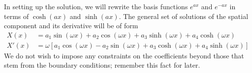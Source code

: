 \documentclass[a4paper]{article}
\begin{document}
In setting up the solution, we will rewrite the basis functions \( e^{ax} \) and \( e^{-ax} \) in terms of \( \cosh\!\left(ax\right) \) and \( \sinh\!\left(ax\right) \). The general set of solutions of the spatial component and its derivative will be of form
\begin{align*}
	X \!\left( x \right) & = a_{1}\sin\!\left(\omega x\right) + a_{2}\cos\!\left(\omega x\right) + a_{3}\sinh\!\left(\omega x\right) + a_{4}\cosh\!\left(\omega x\right) \\
	X'\!\left( x \right) & = \omega \!\left[ a_{1}\cos\!\left(\omega x\right) - a_{2}\sin\!\left(\omega x\right) + a_{3}\cosh\!\left(\omega x\right) + a_{4}\sinh\!\left(\omega x\right) \right]
\end{align*}
We do not wish to impose any constraints on the coefficients beyond those that stem from the boundary conditions; remember this fact for later.
\end{document}
